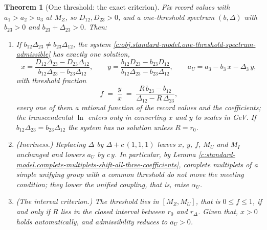 \documentclass[11pt]{article}
\newtheorem{theorem}{Theorem}[section]
\theoremstyle{definition}
\theoremstyle{plain}
\providecommand{\Dl}{}\renewcommand{\Dl}{\Delta}
\begin{document}
\begin{theorem}[One threshold: the exact criterion]\label{c:standard-model.one-threshold-exact-criterion}
Fix record values with $a_{1} > a_{2} > a_{3}$ at $M_{Z}$, so $D_{12}, D_{23} > 0$, and a one-threshold spectrum $(b, \Dl)$ with $b_{23} > 0$ and $b_{23} + \Dl_{23} > 0$. Then:
\begin{enumerate}
\item[(i)] If $b_{12}\Dl_{23} \ne b_{23}\Dl_{12}$, the system \ref{c:obj.standard-model.one-threshold-spectrum-admissible} has exactly one solution,
\[
x = \frac{D_{12}\Dl_{23} - D_{23}\Dl_{12}}{b_{12}\Dl_{23} - b_{23}\Dl_{12}}, \qquad
y = \frac{b_{12}D_{23} - b_{23}D_{12}}{b_{12}\Dl_{23} - b_{23}\Dl_{12}}, \qquad
a_{U} = a_{3} - b_{3}\,x - \Dl_{3}\,y,
\]
with threshold fraction
\[
f \;=\; \frac{y}{x} \;=\; \frac{R\,b_{23} - b_{12}}{\Dl_{12} - R\,\Dl_{23}},
\]
every one of them a rational function of the record values and the coefficients; the transcendental $\ln$ enters only in converting $x$ and $y$ to scales in GeV. If $b_{12}\Dl_{23} = b_{23}\Dl_{12}$ the system has no solution unless $R = r_{0}$.
\item[(ii)] (Inertness.) Replacing $\Dl$ by $\Dl + c\,(1,1,1)$ leaves $x$, $y$, $f$, $M_{U}$ and $M_{I}$ unchanged and lowers $a_{U}$ by $c\,y$. In particular, by Lemma \ref{c:standard-model.complete-multiplets-shift-all-three-coefficients}, complete multiplets of a simple unifying group with a common threshold do not move the meeting condition; they lower the unified coupling, that is, raise $\alpha_{U}$.
\item[(iii)] (The interval criterion.) The threshold lies in $[M_{Z}, M_{U}]$, that is $0 \le f \le 1$, if and only if $R$ lies in the closed interval between $r_{0}$ and $r_{\Dl}$. Given that, $x > 0$ holds automatically, and admissibility reduces to $a_{U} > 0$.
\end{enumerate}
\end{theorem}
\end{document}
